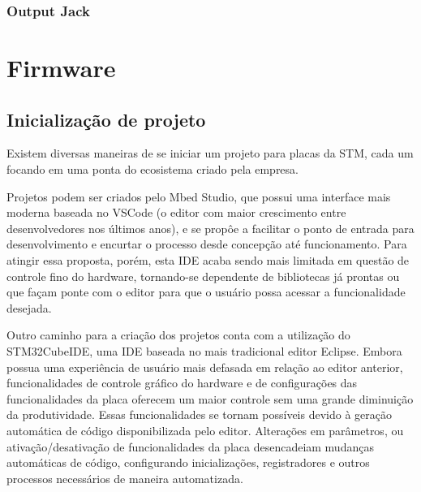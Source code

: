 \subsubsection{Output Jack}

\section{Firmware}

\subsection{Inicialização de projeto}

Existem diversas maneiras de se iniciar um projeto para placas da STM, cada um focando em uma ponta do ecosistema criado pela empresa.

Projetos podem ser criados pelo Mbed Studio, que possui uma interface mais moderna baseada no VSCode (o editor com maior crescimento entre desenvolvedores nos últimos anos), e se propôe a facilitar o ponto de entrada para desenvolvimento e encurtar o processo desde concepção até funcionamento. Para atingir essa proposta, porém, esta IDE acaba sendo mais limitada em questão de controle fino do hardware, tornando-se dependente de bibliotecas já prontas ou que façam ponte com o editor para que o usuário possa acessar a funcionalidade desejada.

Outro caminho para a criação dos projetos conta com a utilização do STM32CubeIDE, uma IDE baseada no mais tradicional editor Eclipse. Embora possua uma experiência de usuário mais defasada em relação ao editor anterior, funcionalidades de controle gráfico do hardware e de configurações das funcionalidades da placa oferecem um maior controle sem uma grande diminuição da produtividade. Essas funcionalidades se tornam possíveis devido à geração automática de código disponibilizada pelo editor. Alterações em parâmetros, ou ativação/desativação de funcionalidades da placa desencadeiam mudanças automáticas de código, configurando inicializações, registradores e outros processos necessários de maneira automatizada.

